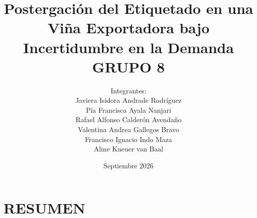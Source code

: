 \documentclass[spanish]{pucthesis}
\renewcommand{\cleardoublepage}{\par}
\begin{document}
\title[Postergación del Etiquetado en una Viña Exportadora bajo Incertidumbre en la Demanda \\ GRUPO 8]{\bf Postergación del Etiquetado en una Viña Exportadora bajo Incertidumbre en la Demanda \\ GRUPO 8}

\author[Integrantes:]{Integrantes:\\
\textnormal{\small{
Javiera Isidora Andrade Rodríguez\\
Pía Francisca Ayala Nanjari\\
Rafael Alfonso Calderón Avendaño\\
Valentina Andrea Gallegos Bravo\\
Francisco Ignacio Indo Maza\\
Aline Kneuer van Baal}
}
}

\address{Escuela de Ingeniería\\
         Pontificia Universidad Católica de Chile\\
         Vicuña Mackenna 4860\\
         Santiago, Chile}

\date{Septiembre 2026}


\NoChapterPageNumber
{}
\maketitle


\newpage
\tableofcontents
{} \label{lista_figuras}
\listoffigures
{} \label{lista_tablas}
\listoftables
\cleardoublepage



 \label{resumen}
\chapter*{RESUMEN}

\end{document}
